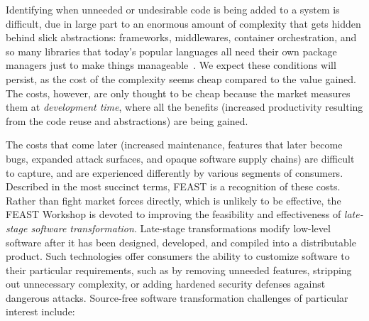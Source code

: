 \documentclass[sigconf]{acmart}
\begin{document}
Identifying when unneeded or undesirable code is being added to a system is
difficult, due in large part to an enormous amount of complexity that gets
hidden behind slick abstractions: frameworks, middlewares, container
orchestration, and so many libraries that today's popular languages all need
their own package managers just to make things manageable~\cite{dusing2022}.  We
expect these conditions will persist, as the cost of the complexity seems cheap
compared to the value gained. The costs, however, are only thought to be cheap
because the market measures them at \emph{development time}, where all the
benefits (increased productivity resulting from the code reuse and abstractions)
are being gained.

The costs that come later (increased maintenance, features that later become
bugs, expanded attack surfaces, and opaque software supply chains) are difficult
to capture, and are experienced differently by various segments of consumers.
Described in the most succinct terms, FEAST is a recognition of these costs.  
Rather than fight market forces directly, which is unlikely to be effective, the
FEAST Workshop is devoted to improving the feasibility and effectiveness of
\emph{late-stage software transformation}. Late-stage transformations modify
low-level software after it has been designed, developed, and compiled into a
distributable product. Such technologies offer consumers the ability to
customize software to their particular requirements, such as by removing
unneeded features, stripping out unnecessary complexity, or adding hardened
security defenses against dangerous attacks. Source-free software transformation
challenges of particular interest include:
\end{document}
